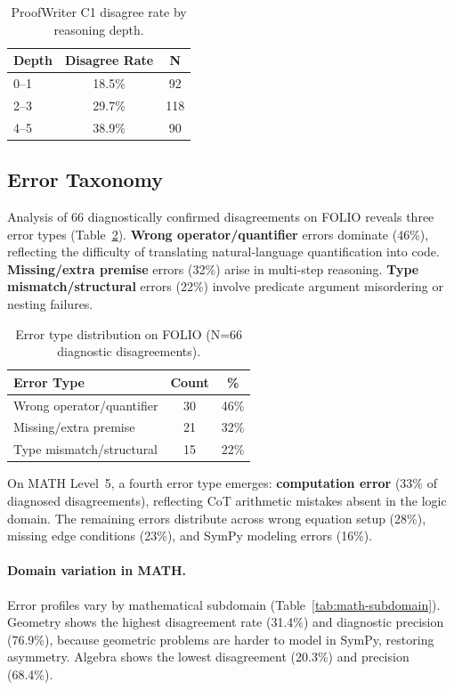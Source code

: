 \documentclass[11pt,a4paper]{article}
\begin{document}
\begin{table}[t]
\centering
\small
\caption{ProofWriter C1 disagree rate by reasoning depth.}
\label{tab:proofwriter-depth}
\begin{tabular}{lcc}
\toprule
\textbf{Depth} & \textbf{Disagree Rate} & \textbf{N} \\
\midrule
0--1 & 18.5\% & 92 \\
2--3 & 29.7\% & 118 \\
4--5 & 38.9\% & 90 \\
\bottomrule
\end{tabular}
\end{table}

\subsection{Error Taxonomy}
\label{sec:taxonomy}

Analysis of 66 diagnostically confirmed disagreements on FOLIO reveals three error types (Table~\ref{tab:error-types}). \textbf{Wrong operator/quantifier} errors dominate (46\%), reflecting the difficulty of translating natural-language quantification into code. \textbf{Missing/extra premise} errors (32\%) arise in multi-step reasoning. \textbf{Type mismatch/structural} errors (22\%) involve predicate argument misordering or nesting failures.

\begin{table}[t]
\centering
\small
\caption{Error type distribution on FOLIO (N=66 diagnostic disagreements).}
\label{tab:error-types}
\begin{tabular}{lcc}
\toprule
\textbf{Error Type} & \textbf{Count} & \textbf{\%} \\
\midrule
Wrong operator/quantifier & 30 & 46\% \\
Missing/extra premise & 21 & 32\% \\
Type mismatch/structural & 15 & 22\% \\
\bottomrule
\end{tabular}
\end{table}

On MATH Level~5, a fourth error type emerges: \textbf{computation error} (33\% of diagnosed disagreements), reflecting CoT arithmetic mistakes absent in the logic domain. The remaining errors distribute across wrong equation setup (28\%), missing edge conditions (23\%), and SymPy modeling errors (16\%).

\paragraph{Domain variation in MATH.} Error profiles vary by mathematical subdomain (Table~\ref{tab:math-subdomain}). Geometry shows the highest disagreement rate (31.4\%) and diagnostic precision (76.9\%), because geometric problems are harder to model in SymPy, restoring asymmetry. Algebra shows the lowest disagreement (20.3\%) and precision (68.4\%).
\end{document}
